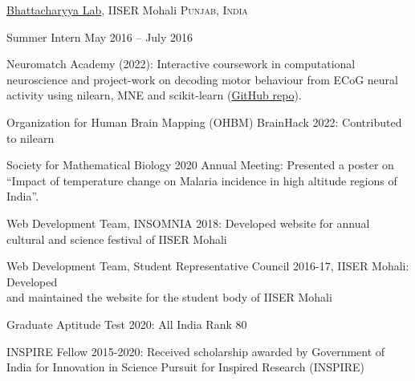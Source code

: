 \documentclass[11pt,a4paper]{article} %
\begin{document}

\headedsection %
{\href{https://sites.google.com/site/drsamarjitbh/}{Bhattacharyya Lab}, IISER Mohali}
{\textsc{Punjab, India}} {

\headedsubsection %
{Summer Intern}
{May 2016 -- July 2016}
{}
}


\spacedhrule{.5em}{-0.4em} %


\inlineheadsection 
{Neuromatch Academy (2022):}
{Interactive coursework in computational neuroscience and project-work on decoding motor behaviour from ECoG neural activity using nilearn, MNE and scikit-learn (\href{https://github.com/xanderladd/nma_motor_imagery}{GitHub repo}).}

\inlineheadsection
{Organization for Human Brain Mapping (OHBM) BrainHack 2022:} 
{Contributed to nilearn}

\inlineheadsection
{Society for Mathematical Biology 2020 Annual Meeting:}
{Presented a poster on “Impact of temperature change on Malaria incidence in high altitude regions of India”.}

\inlineheadsection
{Web Development Team, INSOMNIA 2018:} 
{Developed website for annual cultural and science festival of IISER Mohali}

\inlineheadsection
{Web Development Team, Student Representative Council 2016-17, IISER Mohali:}
{Developed \\and maintained the website for the student body of IISER Mohali}

\spacedhrule{1.5em}{-0.4em}

\inlineheadsection 
{Graduate Aptitude Test 2020:}
{All India Rank 80}

\inlineheadsection
{INSPIRE Fellow 2015-2020:}
{Received scholarship awarded by Government of India for Innovation in Science Pursuit for Inspired Research (INSPIRE)}
\end{document}
